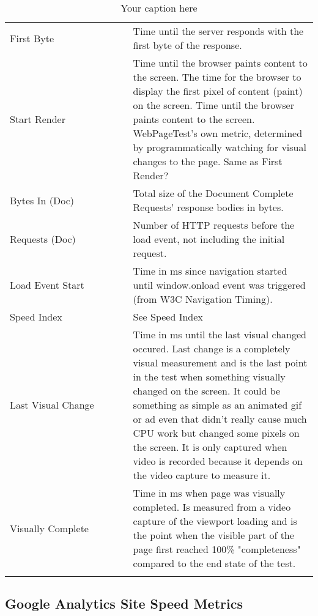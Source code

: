 \begin{center}
\begin{longtable}{ p{0.4\linewidth} | p{0.6\linewidth} }
	First Byte & Time until the server responds with the first byte of the response.  \\
	
	Start Render & Time until the browser paints content to the screen. The time for the browser to display the first pixel of content (paint) on the screen. Time until the browser paints content to the screen. WebPageTest's own metric, determined by programmatically watching for visual changes to the page. Same as First Render? \\
	
	Bytes In (Doc) & Total size of the Document Complete Requests' response bodies in bytes.  \\
	
	Requests (Doc) & Number of HTTP requests before the load event, not including the initial request. \\
	
	Load Event Start & Time in ms since navigation started until window.onload event was triggered (from W3C Navigation Timing). \\
	
	Speed Index	& See Speed Index  \\
	
	Last Visual Change & Time in ms until the last visual changed occured. Last change is a completely visual measurement and is the last point in the test when something visually changed on the screen. It could be something as simple as an animated gif or ad even that didn't really cause much CPU work but changed some pixels on the screen. It is only captured when video is recorded because it depends on the video capture to measure it. \\
	
	Visually Complete & Time in ms when page was visually completed. Is measured from a video capture of the viewport loading and is the point when the visible part of the page first reached 100\% "completeness" compared to the end state of the test. \\
	\caption{Your caption here} %
	\label{tab:myfirstlongtable}
	\end{longtable}
\end{center}




\subsection{Google Analytics Site Speed Metrics}


